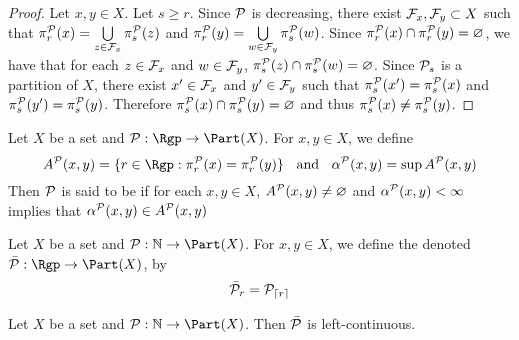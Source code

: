 \documentclass{book}
\begin{document}
\begin{proof}
	Let $x,y \in X$. Let $s \geq r$. Since $\mathcal{P}$ is decreasing, there exist $\mathcal{F}_x, \mathcal{F}_y \subset X$ such that $\pi^{\mathcal{P}}_r(x) = \bigcup\limits_{z \in \mathcal{F}_x} \pi^{\mathcal{P}}_s(z)$ and $\pi^{\mathcal{P}}_r(y) = \bigcup\limits_{w \in \mathcal{F}_y} \pi^{\mathcal{P}}_s(w)$. Since $\pi^{\mathcal{P}}_r(x) \cap \pi^{\mathcal{P}}_r(y) = \varnothing$, we have that for each $z \in \mathcal{F}_x$ and $w \in \mathcal{F}_y$, $\pi^{\mathcal{P}}_s(z) \cap \pi^{\mathcal{P}}_s(w) = \varnothing$. Since $\mathcal{P}_s$ is a partition of $X$, there exist $x' \in \mathcal{F}_x$ and $y' \in \mathcal{F}_y$ such that $\pi^{\mathcal{P}}_s(x') = \pi^{\mathcal{P}}_s(x)$ and $\pi^{\mathcal{P}}_s(y') = \pi^{\mathcal{P}}_s(y)$. Therefore $\pi^{\mathcal{P}}_s(x) \cap \pi^{\mathcal{P}}_s(y) = \varnothing$ and thus $\pi^{\mathcal{P}}_s(x) \neq \pi^{\mathcal{P}}_s(y)$. 
\end{proof}

\begin{defn}
	Let $X$ be a set and $\MP: \Rgp \rightarrow \Part(X)$. For $x,y \in X$, we define 
	$$A^{\MP}(x,y) = \{r \in \Rgp: \pi^{\MP}_r(x) = \pi^{\MP}_r(y)\} \hspace{.2cm} \text{ and } \hspace{.2cm} \al^{\MP}(x,y) = \sup A^{\MP}(x,y)$$
	Then $\mathcal{P}$ is said to be  if for each $x,y \in X$, $A^{\mathcal{P}}(x,y) \neq \varnothing$ and $\alpha^{\mathcal{P}}(x,y) < \infty$ implies that $\alpha^{\mathcal{P}}(x,y) \in A^{\mathcal{P}}(x,y)$
\end{defn}

\begin{defn}
	Let $X$ be a set and $\MP: \N \rightarrow \Part(X)$. For $x,y \in X$, we define the  denoted $\bar{\MP}: \Rgp \rightarrow \Part(X)$, by 
	$$ \bar{\mathcal{P}}_r = \mathcal{P}_{\lceil r \rceil}$$
\end{defn}

\begin{ex}
	Let $X$ be a set and $\MP: \N \rightarrow \Part(X)$. Then $\bar{\mathcal{P}}$ is left-continuous.
\end{ex}
\end{document}
